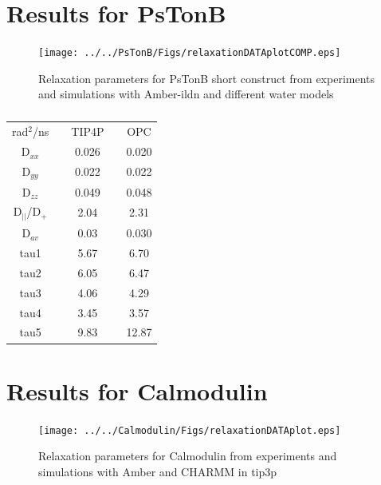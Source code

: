 \documentclass[pre,aps,floatfix,authordate1-4]{revtex4-1}
\begin{document}
\newpage


\section{Results for PsTonB}

\begin{figure}[!h]
  \texttt{[image: ../../PsTonB/Figs/relaxationDATAplotCOMP.eps]}%
  \caption{Relaxation parameters for PsTonB short construct from
    experiments and simulations with Amber-ildn and different water models
    \label{hexPHASEdimensionsPLOT}}%
\end{figure}

\begin{table}[htb]
\centering
\caption{
}\label{ROTdiffCOEFFS}
\begin{tabular}{c c c c c}
rad$^2$/ns   &   &        TIP4P    &          &          OPC \\
D$_{xx}$ & &        0.026  & &         0.020 \\
D$_{yy}$  & &         0.022	 & &  0.022 \\
D$_{zz}$   & &       0.049	 & &  0.048 \\
D$_||$/D$_+$   & &   2.04	& &   2.31 \\
D$_{av}$    & &      0.03   & &       0.030 \\
tau1     & &     5.67	 & &         6.70 \\
tau2     & &     6.05	 & &         6.47 \\
tau3     & &     4.06	 & &         4.29 \\
tau4      & &    3.45	 & &         3.57 \\
tau5      & &    9.83	 & &         12.87 \\
\end{tabular}
\end{table}

\section{Results for Calmodulin}

\begin{figure}[!h]
  \texttt{[image: ../../Calmodulin/Figs/relaxationDATAplot.eps]}%
  \caption{Relaxation parameters for Calmodulin from
    experiments and simulations with Amber and CHARMM in tip3p
    \label{hexPHASEdimensionsPLOT}}%
\end{figure}
\end{document}
